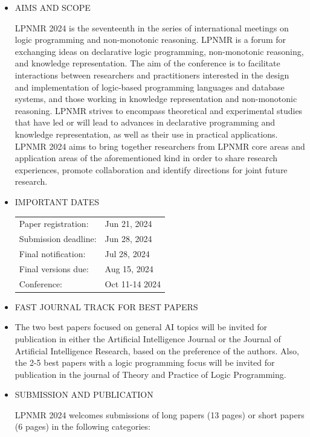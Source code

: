 \documentclass[prodmode,acmtecs]{acmsmall} %
\begin{document}
\begin{itemize}\item  AIMS AND SCOPE 
 
  LPNMR 2024 is the seventeenth in the series of international meetings on logic programming and non-monotonic reasoning. LPNMR is a forum for exchanging ideas on declarative logic programming, non-monotonic reasoning, and knowledge representation. The aim of the conference is to facilitate interactions between researchers and practitioners interested in the design and implementation of logic-based programming languages and database systems, and those working in knowledge representation and non-monotonic reasoning. LPNMR strives to encompass theoretical and experimental studies that have led or will lead to advances in declarative programming and knowledge representation, as well as their use in practical applications. LPNMR 2024 aims to bring together researchers from LPNMR core areas and application areas of the aforementioned kind in order to share research experiences, promote collaboration and identify directions for joint future research. 
 
\item  IMPORTANT DATES 
 
\begin{tabulary}{\linewidth}{LL}Paper registration:  & Jun 21, 2024 \\
Submission deadline:  & Jun 28, 2024 \\
Final notification:  & Jul 28, 2024 \\
Final versions due:  & Aug 15, 2024 \\
Conference:  & Oct 11-14 2024 \\
\end{tabulary}
 
\item  FAST JOURNAL TRACK FOR BEST PAPERS 
 
\item  The two best papers focused on general AI topics will be invited for publication in either the Artificial Intelligence Journal or the Journal of Artificial Intelligence Research, based on the preference of the authors. Also, the 2-5 best papers with a logic programming focus will be invited for publication in the journal of Theory and Practice of Logic Programming. 
 
\item  SUBMISSION AND PUBLICATION  
 
  LPNMR 2024 welcomes submissions of long papers (13 pages) or short papers (6 pages) in the following categories: 
 

\end{itemize}
\end{document}
